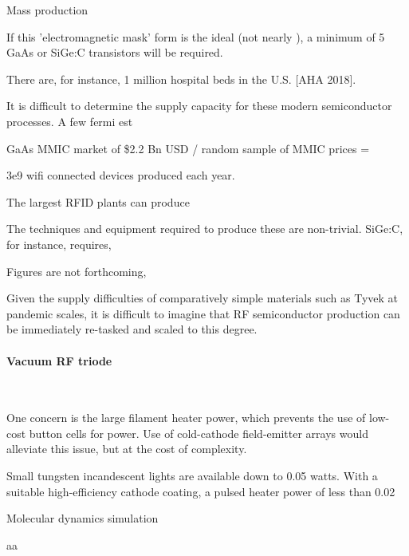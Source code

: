 \documentclass[fleqn,10pt]{article}
\begin{document}
\begin{multicols}{1}
\clearpage
{\Large Mass production}


If this 'electromagnetic mask' form is the ideal (not nearly ), a minimum of 5 GaAs or SiGe:C transistors will be required.

There are, for instance, 1 million hospital beds in the U.S. [AHA 2018]. 

It is difficult to determine the supply capacity for these modern semiconductor processes. A few fermi est

GaAs MMIC market of \$2.2 Bn USD / random sample of MMIC prices = 

3e9 wifi connected devices produced each year.

The largest RFID plants can produce


The techniques and equipment required to produce these are non-trivial. SiGe:C, for instance, requires, 


Figures are not forthcoming, 

Given the supply difficulties of comparatively simple materials such as Tyvek at pandemic scales, it is difficult to imagine that RF semiconductor production can be immediately re-tasked and scaled to this degree. 

\paragraph{\textbf{Vacuum RF triode}}\

One concern is the large filament heater power, which prevents the use of low-cost button cells for power. Use of cold-cathode field-emitter arrays would alleviate this issue, but at the cost of complexity.

Small tungsten incandescent lights are available down to 0.05 watts. With a suitable high-efficiency cathode coating, a pulsed heater power of less than 0.02








\clearpage
{\Large Molecular dynamics simulation}\\
\begin{multicols}{1}


aa





\end{multicols}





\end{multicols}
\end{document}
